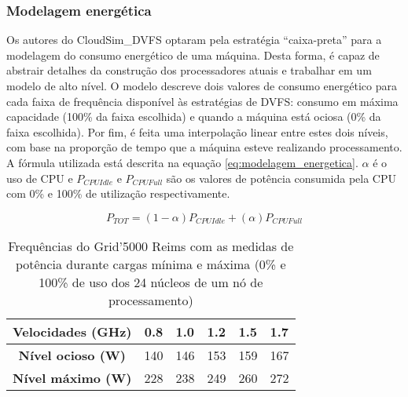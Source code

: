 \subsubsection{Modelagem energética} %
\label{ssub:modelagem_energetica}

Os autores do CloudSim\_DVFS optaram pela estratégia ``caixa-preta'' para a
modelagem do consumo energético de uma máquina. Desta forma, é capaz de abstrair
detalhes da construção dos processadores atuais e trabalhar em um modelo de
alto nível. O modelo descreve dois valores de consumo energético para cada
faixa de frequência disponível às estratégias de DVFS: consumo em máxima
capacidade (100\% da faixa escolhida) e quando a máquina está ociosa (0\% 
da faixa escolhida). Por fim, é feita uma interpolação linear entre estes
dois níveis, com base na proporção de tempo que a máquina esteve realizando
processamento. A fórmula utilizada está descrita na equação \ref{eq:modelagem_energetica}. $\alpha$ é o uso de CPU e $P_{CPUIdle}$ e $P_{CPUFull}$ são os valores
de potência consumida pela CPU com 0\% e 100\% de utilização respectivamente.

\begin{equation}
P_{TOT} = (1 - \alpha)P_{CPUIdle} + (\alpha)P_{CPUFull} \label{eq:modelagem_energetica}  
\end{equation}

\begin{table}
    \centering
    \begin{tabular}{c|cllll}
    \hline
    \textbf{Velocidades (GHz)} & \textbf{0.8} & \textbf{1.0} & \textbf{1.2} & \textbf{1.5} & \textbf{1.7} \\ \hline
    \textbf{Nível ocioso (W)}       & 140          & 146          & 153          & 159          & 167          \\
    \textbf{Nível máximo (W)}  & 228          & 238          & 249          & 260          & 272          \\ \hline
    \end{tabular}
    \caption{Frequências do Grid'5000 Reims com as medidas de potência durante
    cargas mínima e máxima (0\% e 100\% de uso dos 24 núcleos de um nó de processamento)
    \cite{guerout:energy_aware_simulation}}
\end{table}


